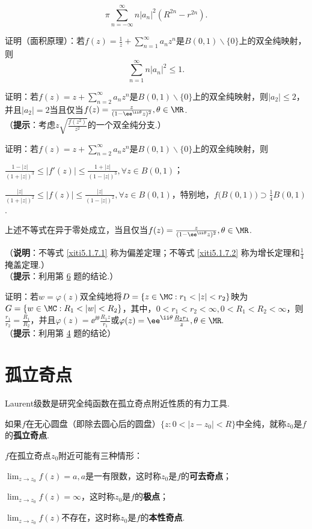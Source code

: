 \begin{xiti}
    \[\pi\sum_{n=-\infty}^\infty n|a_n|^2(R^{2n}-r^{2n}).\]
\item 证明（面积原理）：若$f(z)=\frac1z+\sum_{n=1}^\infty a_nz^n$是$B(0,1)\backslash\{0\}$上的双全纯映射，则
    \[\sum_{n=1}^\infty n|a_n|^2\le1.\]
\item \hypertarget{xiti5.1.6}{} 证明：若$f(z)=z+\sum_{n=2}^\infty a_nz^n$是$B(0,1)\backslash\{0\}$上的双全纯映射，则$|a_2|\le2$，并且$|a_2|=2$当且仅当$f(z)=\frac z{(1-\ee^{\ii\theta}z)^2},\theta\in\MR$.\\
（\textbf{提示}：考虑$z\sqrt{\frac{f(z^2)}{z^2}}$的一个双全纯分支.）
\item 证明：若$f(z)=z+\sum_{n=2}^\infty a_nz^n$是$B(0,1)\backslash\{0\}$上的双全纯映射，则
\begin{enuma}
  \item \label{xiti5.1.7.1}$\frac{1-|z|}{(1+|z|)^3}\le|f'(z)|\le\frac{1+|z|}{(1-|z|)^3},\forall z\in B(0,1)$；
  \item \label{xiti5.1.7.2}$\frac{|z|}{(1+|z|)^2}\le|f(z)|\le\frac{|z|}{(1-|z|)^2},\forall z\in B(0,1)$，特别地，$f\big(B(0,1)\big)\supset \frac14B(0,1)$.
  \item 上述不等式在异于零处成立，当且仅当$f(z)=\frac z{(1-\ee^{\ii\theta}z)^2},\theta\in\MR$.
\end{enuma}
（\textbf{说明}：不等式 \ref{xiti5.1.7.1} 称为偏差定理；不等式 \ref{xiti5.1.7.2} 称为增长定理和$\frac14$掩盖定理.）\\
（\textbf{提示}：利用第 \hyperlink{xiti5.1.6}{6} 题的结论.）
\item 证明：若$w=\varphi(z)$双全纯地将$D=\{z\in\MC:r_1<|z|<r_2\}$映为$G=\{w\in\MC:
R_1<|w|<R_2\}$，其中，$0<r_1<r_2<\infty,0<R_1<R_2<\infty$，则$\frac{r_1}{r_2}=\frac{R_1}{R_2}$，并且$\varphi(z)=\ee^{\ii\theta}\frac{R_1z}{r_1}$或$\varphi(z)=\ee^{\ii\theta}\frac{R_2r_1}z,\theta\in\MR.$\\
（\textbf{提示}：利用第 \hyperlink{xiti5.1.4}{4} 题的结论）
\end{xiti}

\section{孤立奇点\label{sec5.2}}
Laurent级数是研究全纯函数在孤立奇点附近性质的有力工具.

如果$f$在无心圆盘（即除去圆心后的圆盘）$\{z:0<|z-z_0|<R\}$中全纯，就称$z_0$是$f$的\textbf{孤立奇点}.

$f$在孤立奇点$z_0$附近可能有三种情形：
\begin{eenum}
  \item $\lim_{z\to z_0}f(z)=a,a$是一有限数，这时称$z_0$是$f$的\textbf{可去奇点}；
  \item $\lim_{z\to z_0}f(z)=\infty$，这时称$z_0$是$f$的\textbf{极点}；
  \item $\lim_{z\to z_0}f(z)$不存在，这时称$z_0$是$f$的\textbf{本性奇点}.
\end{eenum}

